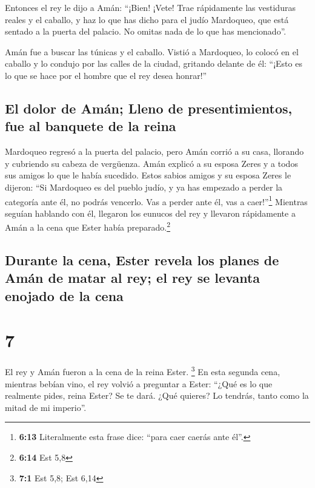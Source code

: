  Entonces el rey le dijo a Amán: ``¡Bien! ¡Vete! Trae
rápidamente las vestiduras reales y el caballo, y haz lo que has dicho
para el judío Mardoqueo, que está sentado a la puerta del palacio. No
omitas nada de lo que has mencionado''.

 Amán fue a buscar las túnicas y el caballo. Vistió a
Mardoqueo, lo colocó en el caballo y lo condujo por las calles de la
ciudad, gritando delante de él: ``¡Esto es lo que se hace por el hombre
que el rey desea honrar!''

\hypertarget{el-dolor-de-amuxe1n-lleno-de-presentimientos-fue-al-banquete-de-la-reina}{%
\subsection{El dolor de Amán; Lleno de presentimientos, fue al banquete
de la
reina}\label{el-dolor-de-amuxe1n-lleno-de-presentimientos-fue-al-banquete-de-la-reina}}

 Mardoqueo regresó a la puerta del palacio, pero Amán
corrió a su casa, llorando y cubriendo su cabeza de vergüenza.
 Amán explicó a su esposa Zeres y a todos sus amigos lo
que le había sucedido. Estos sabios amigos y su esposa Zeres le dijeron:
``Si Mardoqueo es del pueblo judío, y ya has empezado a perder la
categoría ante él, no podrás vencerlo. Vas a perder ante él, vas a
caer!''\footnote{\textbf{6:13} Literalmente esta frase dice: ``para caer
  caerás ante él''.}  Mientras seguían hablando con él,
llegaron los eunucos del rey y llevaron rápidamente a Amán a la cena que
Ester había preparado.\footnote{\textbf{6:14} Est 5,8}

\hypertarget{durante-la-cena-ester-revela-los-planes-de-amuxe1n-de-matar-al-rey-el-rey-se-levanta-enojado-de-la-cena}{%
\subsection{Durante la cena, Ester revela los planes de Amán de matar al
rey; el rey se levanta enojado de la
cena}\label{durante-la-cena-ester-revela-los-planes-de-amuxe1n-de-matar-al-rey-el-rey-se-levanta-enojado-de-la-cena}}

\hypertarget{section-6}{%
\section{7}\label{section-6}}

 El rey y Amán fueron a la cena de la reina Ester.
\footnote{\textbf{7:1} Est 5,8; Est 6,14}  En esta segunda
cena, mientras bebían vino, el rey volvió a preguntar a Ester: ``¿Qué es
lo que realmente pides, reina Ester? Se te dará. ¿Qué quieres? Lo
tendrás, tanto como la mitad de mi imperio''.

